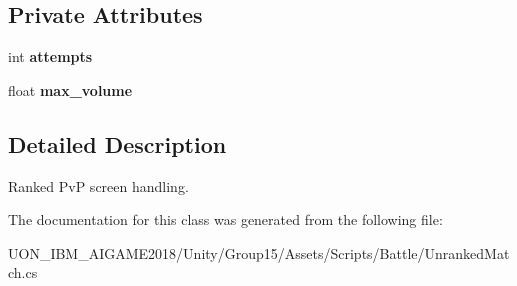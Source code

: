 \subsection*{Private Attributes}
\begin{DoxyCompactItemize}
\item 
\mbox{\label{class_unranked_match_a6a0e41bddbea09b48e2129f35875daf2}} 
int {\bfseries attempts}
\item 
\mbox{\label{class_unranked_match_a5aa53fa5b0f4ff0b942fd905beea8c6e}} 
float {\bfseries max\+\_\+volume}
\end{DoxyCompactItemize}


\subsection{Detailed Description}
Ranked PvP screen handling. 

The documentation for this class was generated from the following file\+:\begin{DoxyCompactItemize}
\item 
U\+O\+N\+\_\+\+I\+B\+M\+\_\+\+A\+I\+G\+A\+M\+E2018/\+Unity/\+Group15/\+Assets/\+Scripts/\+Battle/Unranked\+Match.\+cs\end{DoxyCompactItemize}
